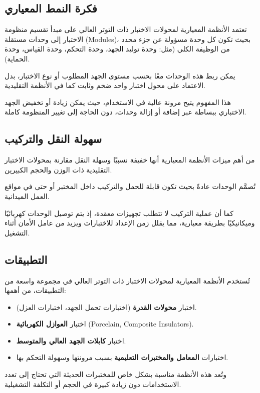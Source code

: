 \documentclass[a4paper, 14pt]{extarticle} %
\newcommand{\en}{\textenglish}
\begin{document}
      \subsection{فكرة النمط المعياري}
        تعتمد الأنظمة المعيارية لمحولات الاختبار ذات التوتر العالي على مبدأ تقسيم منظومة الاختبار إلى وحدات مستقلة \en{(Modules)}، بحيث تكون كل وحدة مسؤولة عن جزء محدد من الوظيفة الكلي
        (مثل: وحدة توليد الجهد، وحدة التحكم، وحدة القياس، وحدة الحماية).
        
        يمكن ربط هذه الوحدات معًا بحسب مستوى الجهد المطلوب أو نوع الاختبار، بدل الاعتماد على محول اختبار واحد ضخم وثابت كما في الأنظمة التقليدية.
        
        هذا المفهوم يتيح مرونة عالية في الاستخدام، حيث يمكن زيادة أو تخفيض الجهد الاختباري ببساطة عبر إضافة أو إزالة وحدات، دون الحاجة إلى تغيير المنظومة كاملة.
      \subsection{سهولة النقل والتركيب}
        من أهم ميزات الأنظمة المعيارية أنها خفيفة نسبيًا وسهلة النقل مقارنة بمحولات الاختبار التقليدية ذات الوزن والحجم الكبيرين.
        
        تُصمَّم الوحدات عادةً بحيث تكون قابلة للحمل والتركيب داخل المختبر أو حتى في مواقع العمل الميدانية.
        
        كما أن عملية التركيب لا تتطلب تجهيزات معقدة، إذ يتم توصيل الوحدات كهربائيًا وميكانيكيًا بطريقة معيارية، مما يقلل زمن الإعداد للاختبارات ويزيد من عامل الأمان أثناء التشغيل.
      \subsection{التطبيقات}
        تُستخدم الأنظمة المعيارية لمحولات الاختبار ذات التوتر العالي في مجموعة واسعة من التطبيقات، من أهمها:
        \begin{itemize}
          \item 
          اختبار \textbf{محولات القدرة}
          (اختبارات تحمل الجهد، اختبارات العزل).
          \item
          اختبار \textbf{العوازل الكهربائية}
          \en{(Porcelain, Composite Insulators)}.
          \item
          اختبار \textbf{كابلات الجهد العالي والمتوسط}.
          \item 
          اختبارات \textbf{المعامل والمختبرات التعليمية} بسبب مرونتها وسهولة التحكم بها.
        \end{itemize}
        وتُعد هذه الأنظمة مناسبة بشكل خاص للمختبرات الحديثة التي تحتاج إلى تعدد الاستخدامات دون زيادة كبيرة في الحجم أو التكلفة التشغيلية.
      
\end{document}

